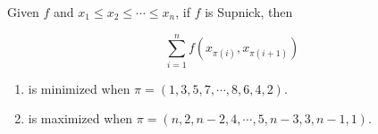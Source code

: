Given $f$ and $x_1 \leq x_2 \leq \cdots \leq x_n$, if $f$ is Supnick, then 

$$
\sum_{i = 1}^n f(x_{\pi(i)}, x_{\pi(i+1)})
$$

\begin{enumerate}
\item is minimized when $\pi = (1,3,5,7, \cdots, 8,6,4,2)$.
\item is maximized when $\pi = (n,2,n-2,4, \cdots, 5,n-3,3,n-1,1)$.
\end{enumerate}
